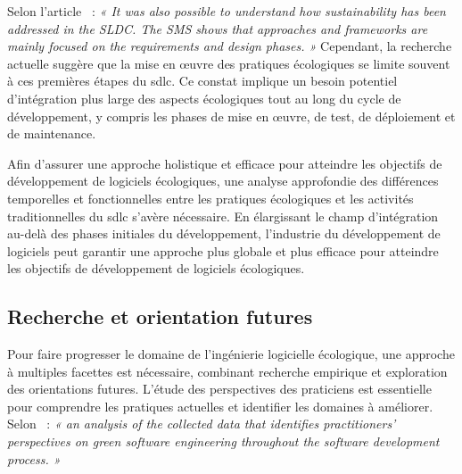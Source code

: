 Selon l'article~\cite{GreenSustainableEngMapping} : \emph{« It was also possible to understand how sustainability has been addressed in the SLDC. The SMS shows that approaches and frameworks are mainly focused on the requirements and design phases. »} Cependant, la recherche actuelle suggère que la mise en œuvre des pratiques écologiques se limite souvent à ces premières étapes du \acrshort{sdlc}. Ce constat implique un besoin potentiel d'intégration plus large des aspects écologiques tout au long du cycle de développement, y compris les phases de mise en œuvre, de test, de déploiement et de maintenance.


Afin d'assurer une approche holistique et efficace pour atteindre les objectifs de développement de logiciels écologiques, une analyse approfondie des différences temporelles et fonctionnelles entre les pratiques écologiques et les activités traditionnelles du \acrshort{sdlc} s'avère nécessaire. En élargissant le champ d'intégration au-delà des phases initiales du développement, l'industrie du développement de logiciels peut garantir une approche plus globale et plus efficace pour atteindre les objectifs de développement de logiciels écologiques.


\subsection{Recherche et orientation futures}
Pour faire progresser le domaine de l'ingénierie logicielle écologique, une approche à multiples facettes est nécessaire, combinant recherche empirique et exploration des orientations futures. L'étude des perspectives des praticiens est essentielle pour comprendre les pratiques actuelles et identifier les domaines à améliorer. Selon~\cite{EmpiricalStudy} : \emph{« an analysis of the collected data that identifies practitioners’ perspectives on green software engineering throughout the software development process. »}


